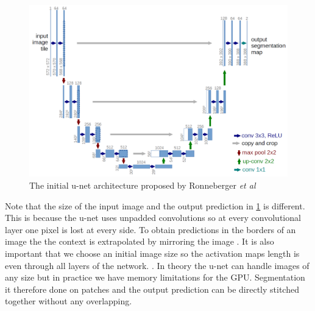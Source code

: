 \documentclass[a4paper,11pt]{article}
\begin{document}
\begin{figure}[h!]
  \centering
      \includegraphics[scale=0.2]{u-net}
  \caption{The initial u-net architecture proposed by Ronneberger \textit{et al} \cite{ronneberger_u-net:_2015} \label{fig:unet}}
\end{figure}
Note that the size of the input image and the output prediction in \ref{fig:unet} is different. This is because the u-net uses unpadded convolutions so at every convolutional layer one pixel is lost at every side. To obtain predictions in the borders of an image the the context is extrapolated by mirroring the image \cite{li_deepunet:_2017}. It is also important that we choose an initial image size so the activation maps length is even through all layers of the network. \cite{ronneberger_u-net:_2015}. In theory the u-net can handle images of any size but in practice we have memory limitations for the GPU. Segmentation it therefore done on patches and the output prediction can be directly stitched together without any overlapping.
\end{document}
